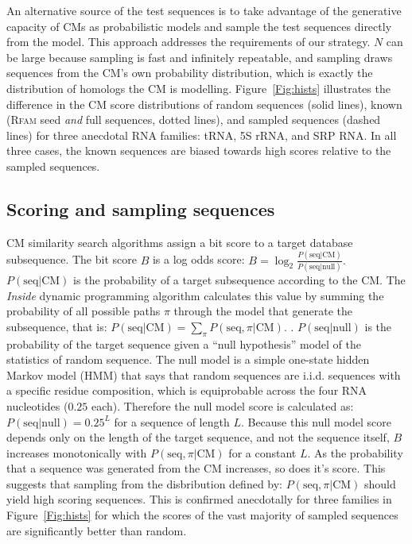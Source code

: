 An alternative source of the test sequences is to take advantage of
the generative capacity of CMs as probabilistic models and sample the
test sequences directly from the model.  This approach addresses the
requirements of our strategy. $N$ can be large because sampling is
fast and infinitely repeatable, and sampling draws sequences from the
CM's own probability distribution, which is exactly the distribution
of homologs the CM is modelling.  Figure~\ref{Fig:hists} illustrates
the difference in the CM score distributions of random sequences
(solid lines), known (\textsc{Rfam} seed \emph{and} full sequences,
dotted lines), and sampled sequences (dashed lines) for three
anecdotal RNA families: tRNA, 5S rRNA, and SRP RNA. In all three
cases, the known sequences are biased towards high scores relative to
the sampled sequences.


\subsection{Scoring and sampling sequences}

CM similarity search algorithms assign a bit score to a target
database subsequence. The bit score $B$ is a log odds score: $B =
\log_2 \frac {P( \mbox{seq} | \mbox{CM})} { P (\mbox{seq} |
  \mbox{null})}.$ $P( \mbox{seq} | \mbox{CM})$ is the probability of a
target subsequence according to the CM. The \emph{Inside} dynamic
programming algorithm calculates this value by summing the probability
of all possible paths $\pi$ through the model that generate the
subsequence, that is: $P( \mbox{seq} | \mbox{CM} ) = \sum_{\pi} P(
\mbox{seq}, \pi | \mbox{CM}).$ \citep{Durbin98}.  $P (\mbox{seq} |
\mbox{null}) $ is the probability of the target sequence given a
``null hypothesis'' model of the statistics of random sequence. The
null model is a simple one-state hidden Markov model (HMM) that says
that random sequences are i.i.d. sequences with a specific residue
composition, which is equiprobable across the four RNA nucleotides
($0.25$ each).  Therefore the null model score is calculated as: $ P
(\mbox{seq} | \mbox{null}) = 0.25^L$ for a sequence of length
$L$. Because this null model score depends only on the length of the
target sequence, and not the sequence itself, $B$ increases
monotonically with $P( \mbox{seq}, \pi | \mbox{CM})$ for a constant
$L$.  As the probability that a sequence was generated from the CM
increases, so does it's score. This suggests that sampling from the
disbribution defined by: $P ( \mbox{seq}, \pi | \mbox{CM} )$ should
yield high scoring sequences.  This is confirmed anecdotally for three
families in Figure~\ref{Fig:hists} for which the scores of the vast
majority of sampled sequences are significantly better than random.


